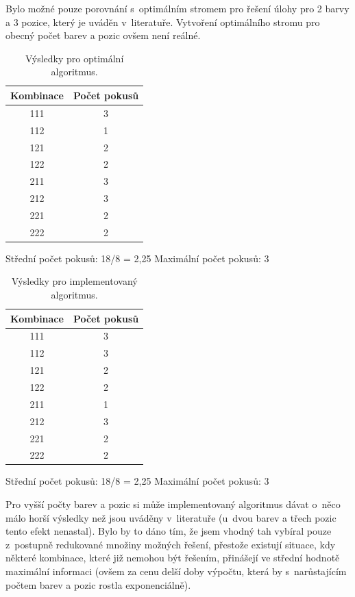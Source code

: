 \documentclass[12pt, a4paper]{article}
\begin{document}
Bylo možné pouze porovnání s~optimálním stromem pro řešení úlohy pro 2 barvy a 3 pozice, který je uváděn v~literatuře. Vytvoření optimálního stromu pro obecný počet barev a pozic ovšem není reálné.

\begin{table}[h]
\centering
\begin{tabular}{c | c }

Kombinace &   Počet pokusů\\
\hline
111  & 3\\
112  & 1\\
121  & 2\\
122  & 2\\
211  & 3\\
212  & 3\\
221  & 2\\
222  & 2\\

\end{tabular}

Střední počet pokusů:  18/8 = 2,25
Maximální počet pokusů:  3 
\caption{Výsledky pro optimální algoritmus.}
\end{table}



\begin{table}[h]
\centering
\begin{tabular}{c | c }

Kombinace &   Počet pokusů\\
\hline
111  & 3\\
112  & 3\\
121  & 2\\
122  & 2\\
211  & 1\\
212  & 3\\
221  & 2\\
222  & 2\\

\end{tabular}

Střední počet pokusů:  18/8 = 2,25
Maximální počet pokusů:  3 
\caption{Výsledky pro implementovaný algoritmus.}
\end{table}

Pro vyšší počty barev a pozic si může implementovaný algoritmus dávat o~něco málo horší výsledky než jsou uváděny v~literatuře (u~dvou barev a třech pozic tento efekt nenastal). Bylo by to dáno tím, že jsem vhodný tah vybíral pouze z~postupně redukované množiny možných řešení, přestože existují situace, kdy některé kombinace, které již nemohou být řešením, přinášejí ve střední hodnotě maximální informaci (ovšem za cenu delší doby výpočtu, která by s~narůstajícím počtem barev a pozic rostla exponenciálně). 
\end{document}
